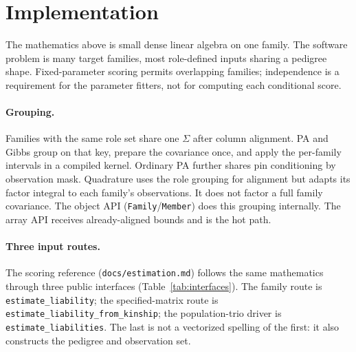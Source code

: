 \documentclass[11pt,a4paper]{article}
\begin{document}


\section{Implementation}
\label{sec:impl}

The mathematics above is small dense linear algebra on one family.
The software problem is many target families, most role-defined inputs
sharing a pedigree shape. Fixed-parameter scoring permits overlapping
families; independence is a requirement for the parameter fitters, not for
computing each conditional score.

\paragraph{Grouping.}
Families with the same role set share one $\Sigma$ after column alignment.
PA and Gibbs group on that key, prepare the covariance once, and apply the
per-family intervals in a compiled kernel.
Ordinary PA further shares pin conditioning by observation mask.
Quadrature uses the role grouping for alignment but adapts its factor integral
to each family's observations. It does not factor a full family covariance.
The object API (\texttt{Family}/\texttt{Member}) does this grouping
internally.
The array API receives already-aligned bounds and is the hot path.

\paragraph{Three input routes.}
The scoring reference (\texttt{docs/estimation.md}) follows the same mathematics through three public interfaces
(Table~\ref{tab:interfaces}). The family route is
\texttt{estimate\_liability}; the specified-matrix route is
\texttt{estimate\_liability\_from\_kinship}; the population-trio driver is
\texttt{estimate\_liabilities}. The last is not a vectorized spelling of
the first: it also constructs the pedigree and observation set.
\end{document}
